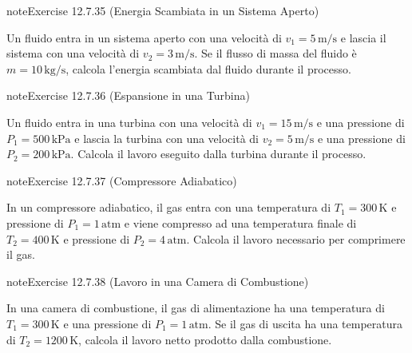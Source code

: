 \documentclass[letterpaper,10pt,italian]{jupyterBook}
\begin{document}
\begin{sphinxadmonition}{note}{Exercise 12.7.35 (Energia Scambiata in un Sistema Aperto)}



\sphinxAtStartPar
Un fluido entra in un sistema aperto con una velocità di \(v_1 = 5 \, \text{m/s}\) e lascia il sistema con una velocità di \(v_2 = 3 \, \text{m/s}\). Se il flusso di massa del fluido è \(m = 10 \, \text{kg/s}\), calcola l’energia scambiata dal fluido durante il processo.
\end{sphinxadmonition}
 \label{exercise:ch/thermodynamics/principles-problems-exercise-35}

\begin{sphinxadmonition}{note}{Exercise 12.7.36 (Espansione in una Turbina)}



\sphinxAtStartPar
Un fluido entra in una turbina con una velocità di \(v_1 = 15 \, \text{m/s}\) e una pressione di \(P_1 = 500 \, \text{kPa}\) e lascia la turbina con una velocità di \(v_2 = 5 \, \text{m/s}\) e una pressione di \(P_2 = 200 \, \text{kPa}\). Calcola il lavoro eseguito dalla turbina durante il processo.
\end{sphinxadmonition}
 \label{exercise:ch/thermodynamics/principles-problems-exercise-36}

\begin{sphinxadmonition}{note}{Exercise 12.7.37 (Compressore Adiabatico)}



\sphinxAtStartPar
In un compressore adiabatico, il gas entra con una temperatura di \(T_1 = 300 \, \text{K}\) e pressione di \(P_1 = 1 \, \text{atm}\) e viene compresso ad una temperatura finale di \(T_2 = 400 \, \text{K}\) e pressione di \(P_2 = 4 \, \text{atm}\). Calcola il lavoro necessario per comprimere il gas.
\end{sphinxadmonition}
 \label{exercise:ch/thermodynamics/principles-problems-exercise-37}

\begin{sphinxadmonition}{note}{Exercise 12.7.38 (Lavoro in una Camera di Combustione)}



\sphinxAtStartPar
In una camera di combustione, il gas di alimentazione ha una temperatura di \(T_1 = 300 \, \text{K}\) e una pressione di \(P_1 = 1 \, \text{atm}\). Se il gas di uscita ha una temperatura di \(T_2 = 1200 \, \text{K}\), calcola il lavoro netto prodotto dalla combustione.
\end{sphinxadmonition}
 \label{exercise:ch/thermodynamics/principles-problems-exercise-38}
\end{document}
